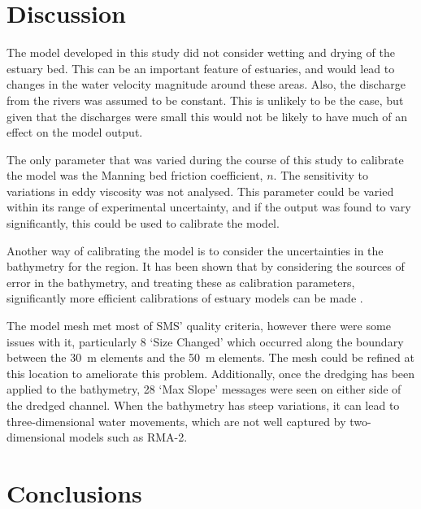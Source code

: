 \documentclass{article}
\begin{document}
\clearpage
\section{Discussion}

The model developed in this study did not consider wetting and drying of the estuary bed. This can be an important feature of estuaries, and would lead to changes in the water velocity magnitude around these areas. Also, the discharge from the rivers was assumed to be constant. This is unlikely to be the case, but given that the discharges were small this would not be likely to have much of an effect on the model output.

The only parameter that was varied during the course of this study to calibrate the model was the Manning bed friction coefficient, $n$. The sensitivity to variations in eddy viscosity was not analysed. This parameter could be varied within its range of experimental uncertainty, and if the output was found to vary significantly, this could be used to calibrate the model. 

Another way of calibrating the model is to consider the uncertainties in the bathymetry for the region. It has been shown that by considering the sources of error in the bathymetry, and treating these as calibration parameters, significantly more efficient calibrations of estuary models can be made \parencite{cea2012bathymetric}.

The model mesh met most of SMS' quality criteria, however there were some issues with it, particularly 8 `Size Changed' which occurred along the boundary between the \SI{30}{m} elements and the \SI{50}{m} elements. The mesh could be refined at this location to ameliorate this problem. Additionally, once the dredging has been applied to the bathymetry, 28 `Max Slope' messages were seen on either side of the dredged channel. When the bathymetry has steep variations, it can lead to three-dimensional water movements, which are not well captured by two-dimensional models such as RMA-2.




\section{Conclusions}

\end{document}
